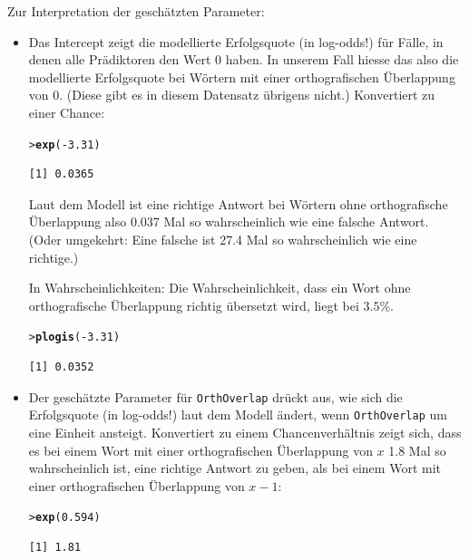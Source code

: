 \documentclass[oneside, 10pt]{book}\usepackage[]{graphicx}\usepackage[]{xcolor}
\makeatletter
\newcommand{\hlnum}[1]{\textcolor[rgb]{0.686,0.059,0.569}{#1}}%
\newcommand{\hlopt}[1]{\textcolor[rgb]{0,0,0}{#1}}%
\newcommand{\hlstd}[1]{\textcolor[rgb]{0.345,0.345,0.345}{#1}}%
\newcommand{\hlkwd}[1]{\textcolor[rgb]{0.737,0.353,0.396}{\textbf{#1}}}%
\newenvironment{kframe}{%
 \def\at@end@of@kframe{}%
 \ifinner\ifhmode%
  \def\at@end@of@kframe{\end{minipage}}%
  \begin{minipage}{\columnwidth}%
 \fi\fi%
 \def\FrameCommand##1{\hskip\@totalleftmargin \hskip-\fboxsep
 \colorbox{shadecolor}{##1}\hskip-\fboxsep
     \hskip-\linewidth \hskip-\@totalleftmargin \hskip\columnwidth}%
 \MakeFramed {\advance\hsize-\width
   \@totalleftmargin\z@ \linewidth\hsize
   \@setminipage}}%
 {\par\unskip\endMakeFramed%
 \at@end@of@kframe}
\newenvironment{knitrout}{}{} %
\makeatother
\begin{document}
Zur Interpretation der geschätzten Parameter:
\begin{itemize}
 \item Das Intercept zeigt die modellierte Erfolgsquote
 (in log-odds!) für Fälle, in denen alle Prädiktoren den
 Wert 0 haben. In unserem Fall hiesse das also die modellierte
 Erfolgsquote bei Wörtern mit einer orthografischen Überlappung
 von 0. (Diese gibt es in diesem Datensatz übrigens nicht.)
 Konvertiert zu einer Chance:
\begin{knitrout}
\color{fgcolor}\begin{kframe}
\begin{alltt}
\hlstd{> }\hlkwd{exp}\hlstd{(}\hlopt{-}\hlnum{3.31}\hlstd{)}
\end{alltt}
\begin{verbatim}
[1] 0.0365
\end{verbatim}
\end{kframe}
\end{knitrout}
  Laut dem Modell ist eine richtige Antwort bei Wörtern
  ohne orthografische Überlappung also 0.037 Mal so wahrscheinlich
  wie eine falsche Antwort. (Oder umgekehrt: Eine falsche ist
  27.4 Mal so wahrscheinlich wie eine richtige.)

  In Wahrscheinlichkeiten: Die Wahrscheinlichkeit, dass ein Wort
  ohne orthografische Überlappung richtig übersetzt wird, liegt bei
  $3.5$\%.
\begin{knitrout}
\color{fgcolor}\begin{kframe}
\begin{alltt}
\hlstd{> }\hlkwd{plogis}\hlstd{(}\hlopt{-}\hlnum{3.31}\hlstd{)}
\end{alltt}
\begin{verbatim}
[1] 0.0352
\end{verbatim}
\end{kframe}
\end{knitrout}

\item Der geschätzte Parameter für \texttt{OrthOverlap} drückt aus,
wie sich die Erfolgsquote (in log-odds!) laut dem Modell ändert,
wenn \texttt{OrthOverlap} um eine Einheit ansteigt. Konvertiert
zu einem Chancenverhältnis zeigt sich, dass es bei einem Wort
mit einer orthografischen Überlappung von $x$ 1.8 Mal so
wahrscheinlich ist, eine richtige Antwort zu geben, als bei einem
Wort mit einer orthografischen Überlappung von $x - 1$:
\begin{knitrout}
\color{fgcolor}\begin{kframe}
\begin{alltt}
\hlstd{> }\hlkwd{exp}\hlstd{(}\hlnum{0.594}\hlstd{)}
\end{alltt}
\begin{verbatim}
[1] 1.81
\end{verbatim}
\end{kframe}
\end{knitrout}


\end{itemize}
\end{document}
